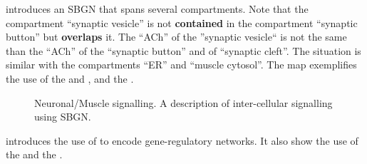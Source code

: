  introduces an SBGN \PD that spans several compartments. Note that the compartment ``synaptic vesicle'' is not \textbf{contained} in the compartment ``synaptic button'' but \textbf{overlaps} it. The  ``ACh'' of the ''synaptic vesicle`` is not the same  than the ``ACh'' of the ``synaptic button'' and of ``synaptic cleft''.  The situation is similar with the compartments ``ER'' and ``muscle cytosol''.  The map exemplifies the use of the   and , and the  .

\begin{figure}[htb]
\begin{center}
\caption{Neuronal/Muscle signalling. A description of inter-cellular signalling using SBGN.}
\label{fig:muscle}
\end{center}
\end{figure}

 introduces the use of \SBGNPDLone to encode gene-regulatory networks. It also show the use of the   and the  .

